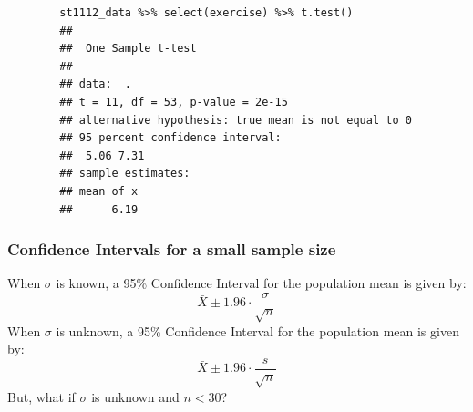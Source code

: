 \documentclass[a4paper, 10pt]{article}
\begin{document}
\begin{examplebox}
    \begin{lstlisting}
        st1112_data %>% select(exercise) %>% t.test()
        ## 
        ##  One Sample t-test
        ## 
        ## data:  .
        ## t = 11, df = 53, p-value = 2e-15
        ## alternative hypothesis: true mean is not equal to 0
        ## 95 percent confidence interval:
        ##  5.06 7.31
        ## sample estimates:
        ## mean of x 
        ##      6.19

    \end{lstlisting}
\end{examplebox}

\pagebreak
\subsubsection{Confidence Intervals for a small sample size}
When $\sigma$ is known, a 95\% Confidence Interval for the population mean is given by:
$$\bar{X} \pm 1.96  \cdot \frac{\sigma}{\sqrt{n}}$$
When $\sigma$ is unknown, a 95\% Confidence Interval for the population mean is given by:
$$\bar{X} \pm 1.96  \cdot \frac{s}{\sqrt{n}}$$
But, what if $\sigma$ is unknown and $n < 30$?
\end{document}
